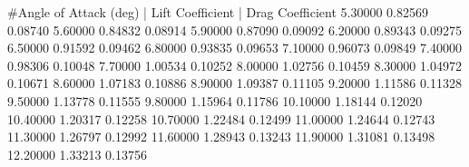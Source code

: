 #Angle of Attack (deg) | Lift Coefficient | Drag Coefficient
     5.30000            0.82569       0.08740
     5.60000            0.84832       0.08914
     5.90000            0.87090       0.09092
     6.20000            0.89343       0.09275
     6.50000            0.91592       0.09462
     6.80000            0.93835       0.09653
     7.10000            0.96073       0.09849
     7.40000            0.98306       0.10048
     7.70000            1.00534       0.10252
     8.00000            1.02756       0.10459
     8.30000            1.04972       0.10671
     8.60000            1.07183       0.10886
     8.90000            1.09387       0.11105
     9.20000            1.11586       0.11328
     9.50000            1.13778       0.11555
     9.80000            1.15964       0.11786
    10.10000            1.18144       0.12020
    10.40000            1.20317       0.12258
    10.70000            1.22484       0.12499
    11.00000            1.24644       0.12743
    11.30000            1.26797       0.12992
    11.60000            1.28943       0.13243
    11.90000            1.31081       0.13498
    12.20000            1.33213       0.13756
